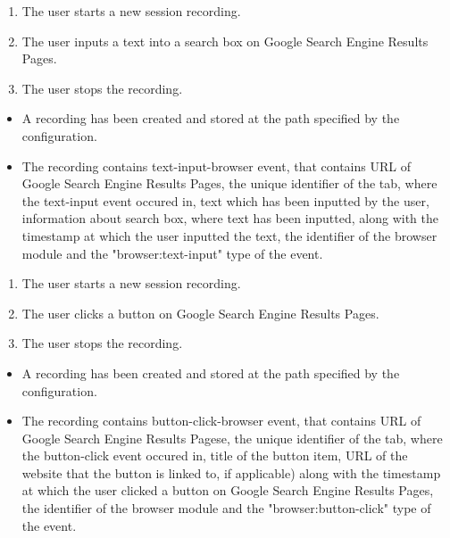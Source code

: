 \begin{tests}
	{\begin{enumerate}
		\item The \gls{user} starts a new session recording.
		\item The \gls{user} inputs a text into a search box on Google Search Engine Results Pages.
		\item The \gls{user} stops the recording.
	\end{enumerate}}
	{\begin{itemize}
		\item A recording has been created and stored at the path specified by the configuration.
		\item The recording contains text-input-browser event, that contains URL of Google Search Engine Results Pages, the unique identifier of the tab, where the text-input event occured in, text which has been inputted by the user, information about search box, where text has been inputted, along with the timestamp at which the user inputted the text, the identifier of the browser module and the "browser:text-input" type of the event.
	\end{itemize}}
	
	
	{\begin{enumerate}
		\item The \gls{user} starts a new session recording.
		\item The \gls{user} clicks a button on Google Search Engine Results Pages.
		\item The \gls{user} stops the recording.
	\end{enumerate}}
	{\begin{itemize}
		\item A recording has been created and stored at the path specified by the configuration.
		\item The recording contains button-click-browser event, that contains URL of Google Search Engine Results Pagese, the unique identifier of the tab, where the button-click event occured in, title of the button item, URL of the website that the button is linked to, if applicable) along with the timestamp at which the user clicked a button on Google Search Engine Results Pages, the identifier of the browser module and the "browser:button-click" type of the event.
	\end{itemize}}
	

\end{tests}
